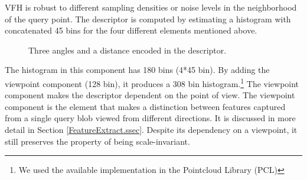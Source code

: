 


VFH is robust to different sampling densities or noise levels in the neighborhood of the query point. 
The descriptor is computed by estimating a histogram with concatenated 45 bins for the four different elements mentioned above.

\begin{figure}[t]
  \caption[Local geometry elements of VFH.]
  {Three angles and a distance encoded in the descriptor.\cite{VFH_Definition}}
  \label{FPFH.figure}
\end{figure}

The histogram in this component has 180 bins (4*45 bin).
By adding the viewpoint component (128 bin), it produces a 308 bin histogram.\footnote{We used the available implementation in the Pointcloud Library (PCL)}
The viewpoint component makes the descriptor dependent on the point of view. The viewpoint component is the element that makes a distinction between features captured from a single query blob viewed from different directions.
It is discussed in more detail in Section \ref{FeatureExtract.ssec}.
Despite its dependency on a viewpoint, it still preserves the property of being scale-invariant. 


